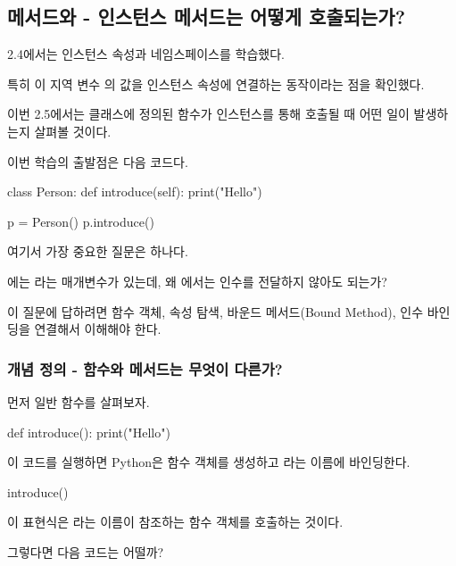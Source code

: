 

\subsection{메서드와  - 인스턴스 메서드는 어떻게 호출되는가?}

2.4에서는 인스턴스 속성과 네임스페이스를 학습했다.

특히 이 지역 변수  의 값을 인스턴스 속성에 연결하는 동작이라는 점을 확인했다.

이번 2.5에서는 클래스에 정의된 함수가 인스턴스를 통해 호출될 때 어떤 일이 발생하는지 살펴볼 것이다.

이번 학습의 출발점은 다음 코드다.

\begin{dhkcode}
class Person:
    def introduce(self):
        print("Hello")

p = Person()
p.introduce()
\end{dhkcode}

여기서 가장 중요한 질문은 하나다.

에는 라는 매개변수가 있는데, 왜 에서는 인수를 전달하지 않아도 되는가?

이 질문에 답하려면 함수 객체, 속성 탐색, 바운드 메서드(Bound Method), 인수 바인딩을 연결해서 이해해야 한다.

\subsubsection{개념 정의 - 함수와 메서드는 무엇이 다른가?}

먼저 일반 함수를 살펴보자.

\begin{dhkcode}
def introduce():
    print("Hello")
\end{dhkcode}

이 코드를 실행하면 Python은 함수 객체를 생성하고 라는 이름에 바인딩한다.

\begin{dhkcode}
introduce()
\end{dhkcode}

이 표현식은 라는 이름이 참조하는 함수 객체를 호출하는 것이다.

그렇다면 다음 코드는 어떨까?

